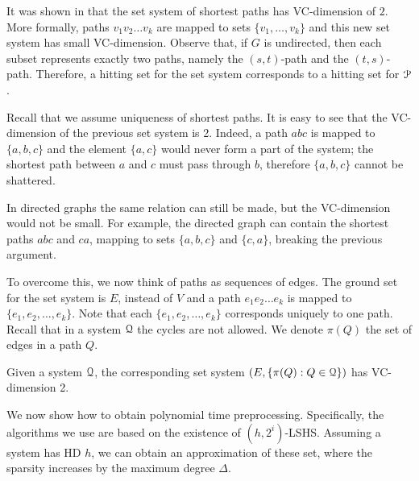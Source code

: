 It was shown in \cite{highway2013} that the set system of shortest paths has VC-dimension of $2$.
More formally, paths $v_1v_2\ldots v_k$ are mapped to sets $\{v_1,\ldots,v_k\}$ and this new set system has small VC-dimension.
Observe that, if $G$ is undirected, then each subset represents exactly two paths, namely the $(s,t)$-path and the $(t,s)$-path.
Therefore, a hitting set for the set system corresponds to a hitting set for $\mathcal{P}$.

Recall that we assume uniqueness of shortest paths.
It is easy to see that the VC-dimension of the previous set system is 2.
Indeed, a path $abc$ is mapped to $\{a,b,c\}$ and the element $\{a,c\}$ would never form a part of the system; the shortest path between $a$ and $c$ must pass through $b$, therefore $\{a,b,c\}$ cannot be shattered.

In directed graphs the same relation can still be made, but the VC-dimension would not be small.
For example, the directed graph can contain the shortest paths $abc$ and $ca$, mapping to sets $\{a,b,c\}$ and $\{c,a\}$, breaking the previous argument.

To overcome this, we now think of paths as sequences of edges.
The ground set for the set system is $E$, instead of $V$ and a path $e_1e_2\ldots e_k$ is mapped to $\{e_1,e_2,\ldots,e_k\}$.
Note that each $\{e_1,e_2,\ldots,e_k\}$ corresponds uniquely to one path.
Recall that in a system $\mathcal{Q}$ the cycles are not allowed.
We denote $\pi(Q)$ the set of edges in a path $Q$.

\begin{proposition}
Given a system $\mathcal{Q}$, the corresponding set system $(E,\{\pi(Q):Q\in\mathcal{Q}\})$ has VC-dimension 2.
\end{proposition}

We now show how to obtain polynomial time preprocessing.
Specifically, the algorithms we use are based on the existence of $(h,2^i)$-LSHS.
Assuming a system has HD $h$, we can obtain an approximation of these set, where the sparsity increases by the maximum degree $\Delta$. 

